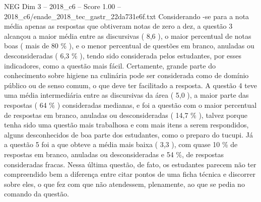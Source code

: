 \begin{textsample}{NEG Dim 3 – 2018\_c6 – Score 1.00 – 2018\_c6/enade\_2018\_tec\_gastr\_22da731e6f.txt}
Considerando -se para a nota média apenas as respostas que obtiveram notas de zero a dez, a questão 3 alcançou a maior média entre as discursivas ( 8,6 ), o maior percentual de notas boas ( mais de 80 \% ), e o menor percentual de questões em branco, anuladas ou desconsideradas ( 6,3 \% ), tendo sido considerada pelos estudantes, por esses indicadores, como a questão mais fácil.
Certamente, grande parte do conhecimento sobre higiene na culinária pode ser considerada como de domínio público ou de senso comum, o que deve ter facilitado a resposta.
A questão 4 teve uma média intermediária entre as discursivas da área ( 5,0 ), a maior parte das respostas ( 64 \% ) consideradas medianas, e foi a questão com o maior percentual de respostas em branco, anuladas ou desconsideradas ( 14,7 \% ), talvez porque tenha sido uma questão mais trabalhosa e com mais itens a serem respondidos, alguns desconhecidos de boa parte dos estudantes, como o preparo do tucupi.
Já a questão 5 foi a que obteve a média mais baixa ( 3,3 ), com quase 10 \% de respostas em branco, anuladas ou desconsideradas e 54 \%, de respostas consideradas fracas.
Nessa última questão, de fato, os estudantes parecem não ter compreendido bem a diferença entre citar pontos de uma ficha técnica e discorrer sobre eles, o que fez com que não atendessem, plenamente, ao que se pedia no comando da questão.

\end{textsample}
